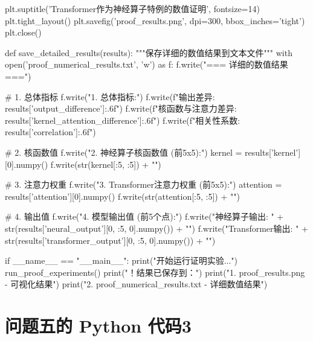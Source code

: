 \documentclass{MMCStyle}
\begin{document}
\begin{python}
    plt.suptitle('Transformer作为神经算子特例的数值证明', fontsize=14)
    plt.tight_layout()
    plt.savefig('proof_results.png', dpi=300, bbox_inches='tight')
    plt.close()

def save_detailed_results(results):
    """保存详细的数值结果到文本文件"""
    with open('proof_numerical_results.txt', 'w') as f:
        f.write("=== 详细的数值结果 ===\n\n")
        
        # 1. 总体指标
        f.write("1. 总体指标:\n")
        f.write(f"输出差异: {results['output_difference']:.6f}\n")
        f.write(f"核函数与注意力差异: {results['kernel_attention_difference']:.6f}\n")
        f.write(f"相关性系数: {results['correlation']:.6f}\n\n")
        
        # 2. 核函数值
        f.write("2. 神经算子核函数值 (前5x5):\n")
        kernel = results['kernel'][0].numpy()
        f.write(str(kernel[:5, :5]) + "\n\n")
        
        # 3. 注意力权重
        f.write("3. Transformer注意力权重 (前5x5):\n")
        attention = results['attention'][0].numpy()
        f.write(str(attention[:5, :5]) + "\n\n")
        
        # 4. 输出值
        f.write("4. 模型输出值 (前5个点):\n")
        f.write("神经算子输出: " + 
                str(results['neural_output'][0, :5, 0].numpy()) + "\n")
        f.write("Transformer输出: " + 
                str(results['transformer_output'][0, :5, 0].numpy()) + "\n")

if __name__ == "__main__":
    print("开始运行证明实验...")
    run_proof_experiments()
    print("！结果已保存到：")
    print("1. proof_results.png - 可视化结果")
    print("2. proof_numerical_results.txt - 详细数值结果")
  \end{python}

\section{问题五的 Python 代码3}
	
\end{document}
